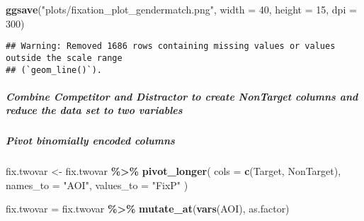\documentclass[
]{article}
\newenvironment{Shaded}{\begin{snugshade}}{\end{snugshade}}
\newcommand{\AttributeTok}[1]{\textcolor[rgb]{0.13,0.29,0.53}{#1}}
\newcommand{\DecValTok}[1]{\textcolor[rgb]{0.00,0.00,0.81}{#1}}
\newcommand{\FunctionTok}[1]{\textcolor[rgb]{0.13,0.29,0.53}{\textbf{#1}}}
\newcommand{\NormalTok}[1]{#1}
\newcommand{\OtherTok}[1]{\textcolor[rgb]{0.56,0.35,0.01}{#1}}
\newcommand{\SpecialCharTok}[1]{\textcolor[rgb]{0.81,0.36,0.00}{\textbf{#1}}}
\newcommand{\StringTok}[1]{\textcolor[rgb]{0.31,0.60,0.02}{#1}}
\begin{document}
\begin{Shaded}
\begin{Highlighting}[]
\FunctionTok{ggsave}\NormalTok{(}\StringTok{"plots/fixation\_plot\_gendermatch.png"}\NormalTok{, }\AttributeTok{width =} \DecValTok{40}\NormalTok{, }\AttributeTok{height =} \DecValTok{15}\NormalTok{, }\AttributeTok{dpi =} \DecValTok{300}\NormalTok{)}
\end{Highlighting}
\end{Shaded}

\begin{verbatim}
## Warning: Removed 1686 rows containing missing values or values outside the scale range
## (`geom_line()`).
\end{verbatim}

\subparagraph{Combine Competitor and Distractor to create NonTarget
columns and reduce the data set to two
variables}\label{combine-competitor-and-distractor-to-create-nontarget-columns-and-reduce-the-data-set-to-two-variables}

\begin{Shaded}
\end{Shaded}

\subparagraph{Pivot binomially encoded
columns}\label{pivot-binomially-encoded-columns}

\begin{Shaded}
\begin{Highlighting}[]
\NormalTok{fix.twovar }\OtherTok{\textless{}{-}}\NormalTok{ fix.twovar }\SpecialCharTok{\%\textgreater{}\%}
  \FunctionTok{pivot\_longer}\NormalTok{(}
    \AttributeTok{cols =} \FunctionTok{c}\NormalTok{(Target, NonTarget),}
    \AttributeTok{names\_to =} \StringTok{"AOI"}\NormalTok{,}
    \AttributeTok{values\_to =} \StringTok{"FixP"}
\NormalTok{  )}

\NormalTok{fix.twovar }\OtherTok{=}\NormalTok{ fix.twovar }\SpecialCharTok{\%\textgreater{}\%} \FunctionTok{mutate\_at}\NormalTok{(}\FunctionTok{vars}\NormalTok{(AOI), as.factor)}
\end{Highlighting}
\end{Shaded}
\end{document}
